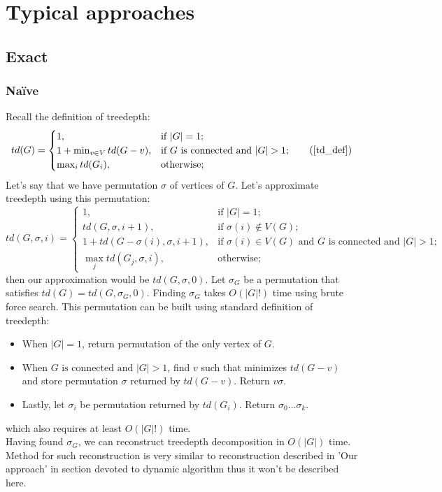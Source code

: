 \section{Typical approaches}
\subsection{Exact}
\subsubsection{Na\"ive}
Recall the definition of treedepth:
\begin{equation*}
td(G)={\begin{cases}1,&{\text{if }}|G|=1;\\1+\min _{{v\in V}}td(G-v),&{\text{if }}G{\text{ is connected and }}|G|>1;\\\max _{{i}}td(G_{i}),&{\text{otherwise}};\end{cases}}\tag{\ref{td_def}}
\end{equation*}
Let's say that we have permutation $\sigma$ of vertices of $G$. Let's approximate treedepth using this permutation:
\begin{equation}
td(G, \sigma, i)={
	\begin{cases}
	1,&{\text{if }}|G|=1;\\
	td(G, \sigma, i + 1), &{\text{if }}\sigma(i)\notin V(G);\\
	1+td(G-\sigma(i), \sigma, i+1),&{\text{if }}{\sigma(i)\in V(G)\text{ and }}G{\text{ is connected and }}|G|>1;\\
	\max _{{j}}td(G_{j}, \sigma, i),&{\text{otherwise}};
	\end{cases}
}
\label{td_def_paermutation}
\end{equation}
then our approximation would be $td(G, \sigma, 0)$. Let $\sigma_G$ be a permutation that satisfies $td(G) = td(G, \sigma_G, 0)$. Finding $\sigma_G$ takes $O\left(\left|G\right|!\right)$ time using brute force search. This permutation can be built using standard definition of treedepth:
\begin{itemize}
	\item When $\left|G\right| = 1$, return permutation of the only vertex of $G$.
	\item When $G{\text{ is connected and }}|G|>1$, find $v$ such that minimizes $td(G-v)$ and store permutation $\sigma$ returned by $td(G-v)$. Return $v\sigma$.
	\item Lastly, let $\sigma_i$ be permutation returned by $td(G_i)$. Return $\sigma_0...\sigma_k$.
\end{itemize}
which also requires at least $O\left(\left|G\right|!\right)$ time.\\
Having found $\sigma_G$, we can reconstruct treedepth decomposition in $O\left(\left|G\right|\right)$ time. Method for such reconstruction is very similar to reconstruction described in 'Our approach' in section devoted to dynamic algorithm thus it won't be described here.
